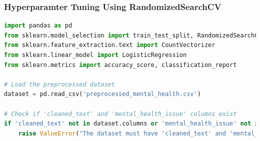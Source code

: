 \subsubsection{Hyperparamter Tuning Using RandomizedSearchCV}

\begin{tcolorbox}[colback=gray!5!white, colframe=gray!80!black, boxrule=0.5pt, title=Logistic Regression]
\begin{lstlisting}[language=Python]
import pandas as pd
from sklearn.model_selection import train_test_split, RandomizedSearchCV
from sklearn.feature_extraction.text import CountVectorizer
from sklearn.linear_model import LogisticRegression
from sklearn.metrics import accuracy_score, classification_report

# Load the preprocessed dataset
dataset = pd.read_csv('preprocessed_mental_health.csv')

# Check if 'cleaned_text' and 'mental_health_issue' columns exist
if 'cleaned_text' not in dataset.columns or 'mental_health_issue' not in dataset.columns:
    raise ValueError("The dataset must have 'cleaned_text' and 'mental_health_issue' columns.")
\end{lstlisting}
\end{tcolorbox}

